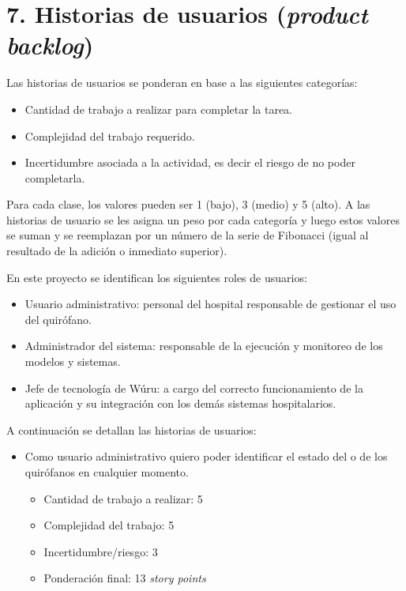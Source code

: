 \documentclass[
11pt, %
]{charter}
\begin{document}



\section{7. Historias de usuarios (\textit{product backlog})}
\label{sec:backlog}

Las historias de usuarios se ponderan en base a las siguientes categorías:
\begin{itemize}
	\item Cantidad de trabajo a realizar para completar la tarea.
	\item Complejidad del trabajo requerido.
	\item Incertidumbre asociada a la actividad, es decir el riesgo de no poder completarla.
\end{itemize}

Para cada clase, los valores pueden ser 1 (bajo), 3 (medio) y 5 (alto). A las historias de usuario se les asigna un peso por cada categoría y luego estos valores se suman y se reemplazan por un número de la serie de Fibonacci (igual al resultado de la adición o inmediato superior).

En este proyecto se identifican los siguientes roles de usuarios:

\begin{itemize}
	\item Usuario administrativo: personal del hospital responsable de gestionar el uso del quirófano. 
	\item Administrador del sistema: responsable de la ejecución y monitoreo de los modelos y sistemas.
	\item Jefe de tecnología de Wúru: a cargo del correcto funcionamiento de la aplicación y su integración con los demás sistemas hospitalarios.
\end{itemize}

A continuación se detallan las historias de usuarios:

\begin{itemize}
	\item Como usuario administrativo quiero poder identificar el estado del o de los quirófanos en cualquier momento. 
	\begin{itemize}
		\item Cantidad de trabajo a realizar: 5
		\item Complejidad del trabajo: 5
		\item Incertidumbre/riesgo: 3
		\item Ponderación final: 13 \textit{story points}
	\end{itemize}
\end{itemize}
\end{document}
